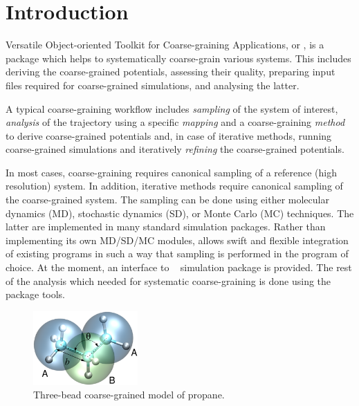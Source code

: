 \chapter{Introduction}


Versatile Object-oriented Toolkit for Coarse-graining Applications, or \votca, is a package which helps to systematically coarse-grain various systems. This includes  deriving the coarse-grained potentials, assessing their quality, preparing input files required for coarse-grained simulations, and analysing the latter. 

A typical coarse-graining workflow includes {\em sampling} of the system of interest, {\em analysis} of the trajectory using a specific {\em mapping} and a coarse-graining {\em method} to derive coarse-grained potentials and, in case of iterative methods, running coarse-grained simulations and iteratively {\em refining} the coarse-grained potentials.

In most cases, coarse-graining requires canonical sampling of a reference (high resolution) system. In addition, iterative methods require canonical sampling of the coarse-grained system. The sampling can be done using either molecular dynamics (MD), stochastic dynamics (SD), or Monte Carlo (MC) techniques. The latter are implemented in many standard simulation packages. Rather than implementing its own MD/SD/MC modules, \votca allows swift and flexible integration of existing  programs in such a way that sampling is performed in the program of choice. At the moment, an interface to \gromacs~\cite{gromacs4} simulation package is provided. The rest of the analysis which needed for systematic coarse-graining is done using the package tools.

\begin{figure}
 \includegraphics[width=4cm]{fig/propane}
 \caption{\small Three-bead coarse-grained model of propane.
 \label{fig:intro:propane}
}
\end{figure}

